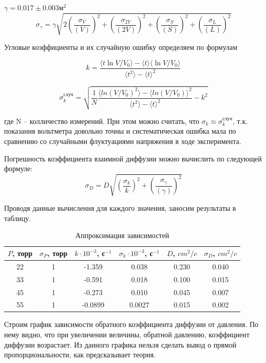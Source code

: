\documentclass[a4paper,12pt]{article}
\begin{document}
$\gamma = 0.017\pm 0.003 м^{2}$
\[ \sigma_{\gamma } = \gamma \sqrt{2\left(\frac{\sigma_{V}}{(V)}\right)^2+\left(\frac{\sigma_{2V}}{(2V)}\right)^2+\left(\frac{\sigma_{S}}{(S)}\right)^2+\left(\frac{\sigma_{L}}{(L)}\right)^2} \]

Угловые коэффициенты и их случайную ошибку определяем по формулам


\begin{equation}\label{mnk:k}
k=\frac{\langle t\ln V/V_0 \rangle - \langle t\rangle \langle \ln V/V_0\rangle}{\langle t^2 \rangle - \langle t \rangle^2}
\end{equation}

\[ \sigma^\text{случ}_k = \sqrt{\frac{1}{N}\frac{\langle ln(V/V_0)^{2}\rangle - \langle ln(V/V_0)\rangle^{2}}{\langle t^{2}\rangle - \langle t\rangle^{2}}- k^{2}} \]


где N -- колличество измерений. При этом можно считать, что $ \sigma_k \approx \sigma_k^\text{случ} $, т.к. показания вольтметра довольно точны и систематическая ошибка мала по сравнению со случайными флуктуациями напряжения в ходе эксперимента.

Погрешность коэффициента взаимной диффузии можно вычислить по следующей формуле:
\[ \sigma_D = D\sqrt{\left(\frac{\sigma_k}{k}\right)^2+\left(\frac{\sigma_{\gamma }}{(\gamma )}\right)^2} \]

Проводя данные вычисления для каждого значения, заносим результаты в таблицу.

\begin{table}[H]
	\centering
	\begin{tabular}{|c|c|c|c|c|c|}
		\hline
		$ P $, торр & $ \sigma_P $, торр & $ k \cdot 10^{-3} $, с$ ^{-1} $ & $ \sigma_{k} \cdot 10^{-3} $, с$ ^{-1} $ & $ D $, $ cm^{2}/c $ & $ \sigma_D $, $ cm^{2}/c $ \\ \hline
		22 & 1 & -1.359 & 0.038 & 0.230 & 0.040 \\ \hline
		33 & 1 &  -0.591&  0.018& 0.100 & 0.015 \\ \hline
		45 & 1 & -0.273 & 0.010 & 0.045 & 0.007 \\ \hline
		55 & 1 & -0.0899 & 0.0027 & 0.015 & 0.002 \\ \hline
	
	\end{tabular}
	\caption{Аппроксимация зависимостей}
	\label{tab:approx}
\end{table}

Строим график зависимости обратного коэффициента диффузии от давления. По нему видно, что при увеличении величины, обратной давлению, коэффициент диффузии возрастает. Из данного графика нельзя сделать вывод о прямой пропорциональности, как предсказывает теория.
\end{document}
